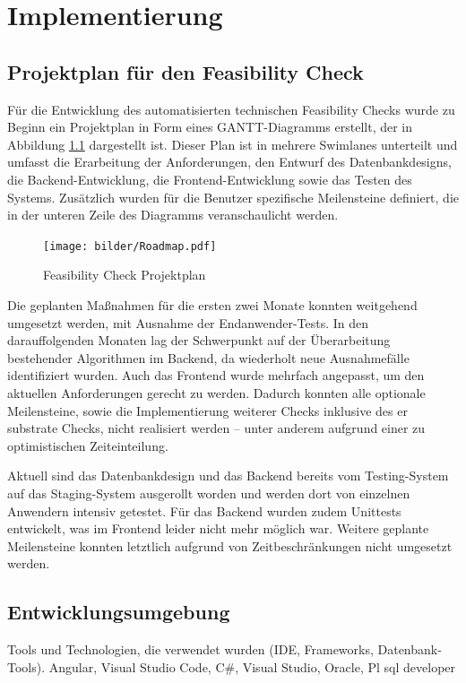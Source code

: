 \chapter{Implementierung}\label{Chap:Implementierung}

\section{Projektplan für den Feasibility Check}
Für die Entwicklung des automatisierten technischen Feasibility Checks wurde zu Beginn ein Projektplan in Form eines GANTT-Diagramms erstellt, der in Abbildung \ref{fig:roadmap} dargestellt ist. Dieser Plan ist in mehrere Swimlanes unterteilt und umfasst die Erarbeitung der Anforderungen, den Entwurf des Datenbankdesigns, die Backend-Entwicklung, die Frontend-Entwicklung sowie das Testen des Systems. Zusätzlich wurden für die Benutzer spezifische Meilensteine definiert, die in der unteren Zeile des Diagramms veranschaulicht werden.

\begin{figure}[!htbp]
    \centering
    \texttt{[image: bilder/Roadmap.pdf]}
    \caption{Feasibility Check Projektplan}
    \label{fig:roadmap}
\end{figure}

Die geplanten Maßnahmen für die ersten zwei Monate konnten weitgehend umgesetzt werden, mit Ausnahme der Endanwender-Tests. In den darauffolgenden Monaten lag der Schwerpunkt auf der Überarbeitung bestehender Algorithmen im Backend, da wiederholt neue Ausnahmefälle identifiziert wurden. Auch das Frontend wurde mehrfach angepasst, um den aktuellen Anforderungen gerecht zu werden. Dadurch konnten alle optionale Meilensteine, sowie die Implementierung weiterer Checks inklusive des er \gls{substrate} Checks, nicht realisiert werden – unter anderem aufgrund einer zu optimistischen Zeiteinteilung.

Aktuell sind das Datenbankdesign und das Backend bereits vom Testing-System auf das Staging-System ausgerollt worden und werden dort von einzelnen Anwendern intensiv getestet. Für das Backend wurden zudem Unittests entwickelt, was im Frontend leider nicht mehr möglich war. Weitere geplante Meilensteine konnten letztlich aufgrund von Zeitbeschränkungen nicht umgesetzt werden.


\section{Entwicklungsumgebung}
Tools und Technologien, die verwendet wurden (IDE, Frameworks, Datenbank-Tools).
Angular, Visual Studio Code, 
C\#, Visual Studio,
Oracle, Pl sql developer

